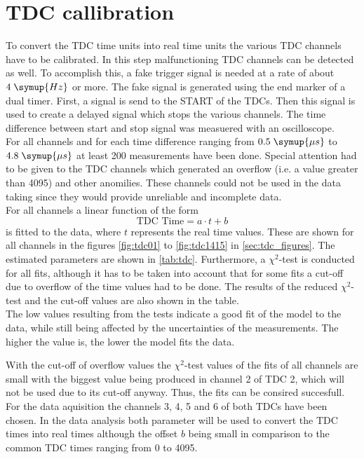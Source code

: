 \section{TDC callibration}
To convert the TDC time units into real time units the various TDC channels have to be calibrated.
In this step malfunctioning TDC channels can be detected as well. To accomplish this,
a fake trigger signal is needed at a rate of about $4 \; \symup{Hz}$ or more. The fake signal is generated using the 
end marker of a dual timer. First, a signal is send to the START of the TDCs. Then this signal is used 
to create a delayed signal which stops the various channels. The time difference between start and stop signal was measuered with 
an oscilloscope. \\
For all channels and for each time difference ranging from $0.5 \; \symup{\mu s}$ to $4.8 \; \symup{\mu s}$ 
at least 200 measurements have been done.
Special attention had to be given to the TDC channels which generated an overflow (i.e. a value greater than 4095)
and other anomilies.
These channels could not be used in the data taking since they would provide unreliable
and incomplete data.\\
For all channels a linear function of the form 
\begin{equation*}
    \text{TDC Time} = a \cdot t + b
\end{equation*}
is fitted to the data, where $t$ represents the real time values.
These are shown for all channels in the figures \ref{fig:tdc01} to
\ref{fig:tdc1415} in \autoref{sec:tdc_figures}.
The estimated parameters are shown in \autoref{tab:tdc}. Furthermore, a $\chi^2$-test is conducted 
for all fits, although it has to be taken into account that for some fits a cut-off due to overflow of
the time values had to be done. The results of the reduced $\chi^2$-test and the cut-off values 
are also shown in the table.\\
The low values resulting from the tests indicate a good fit of the model to the data, while still being affected by the uncertainties 
of the measurements. The higher the value is, the lower the model fits the data.

With the cut-off of overflow values the $\chi^2$-test values of the fits of all channels are 
small with the biggest value being produced in channel 2 of TDC 2, which will not be used due to 
its cut-off anyway. Thus, the fits can be consired succesfull. 
For the data aquisition the channels 3, 4, 5 and 6 of both TDCs have been chosen.
In the data analysis both parameter will be used to convert the TDC times into real times although the 
offset $b$ being small in comparison to the common TDC times ranging from 0 to 4095.


